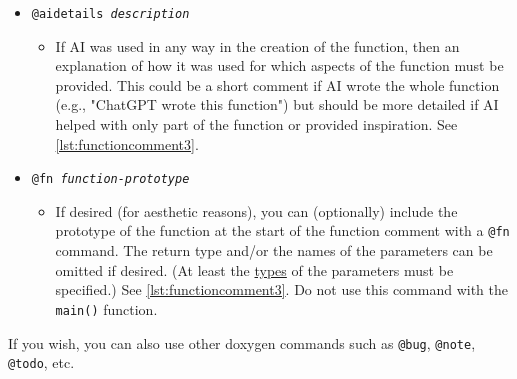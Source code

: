\documentclass{article}
\newcommand{\llabel}[1]{\hypertarget{llineno:#1}{\linelabel{#1}}}
\begin{document}
\begin{itemize}[label={}]
\begin{itemize}[label={}]
    \begin{itemize}[label={$\bullet$}, parsep=-1pt]
    \item \texttt{@ai Not Used} -- indicates that AI was not used in any way in the development of this function. No other \texttt{@ai} commands must be present in the function comment.
    \item \texttt{@ai Wrote Code} -- indicates that an AI tool wrote some or all of the compilable code in this function.
    \item \texttt{@ai Wrote Comments} -- indicates that an AI tool was used to write some or all of the comment text for this function (which includes this function comment and/or comments within the function).
    \item \texttt{@ai Inspiration} -- indicates that you took inspiration from an AI tool (e.g. discovered the existence of a library function). (This attribute is assumed and need not be specified if the \texttt{@ai Wrote Code} command is present for that function.)
    \item \texttt{@ai Debugging} -- indicates that an AI tool was used to help debug the code in this function.
    \item \texttt{@ai Testing} -- indicates that an AI tool was used to help in the testing of the code in this function.
    \end{itemize}
\end{itemize}

\item \texttt{@aidetails \textit{description}}
    \begin{itemize}[label={}]
    \item If AI was used in any way in the creation of the function, then an explanation of how it was used for which aspects of the function must be provided. This could be a short comment if AI wrote the whole function (e.g., "ChatGPT wrote this function") but should be more detailed if AI helped with only part of the function or provided inspiration. See \autoref{lst:functioncomment3}.\llabel{line:aiend}
    \end{itemize}
    
\item \texttt{@fn \textit{function-prototype}}
    \begin{itemize}[label={}]
    \item If desired (for aesthetic reasons), you can (optionally) include the prototype of the function at the start of 
    the function comment with a \texttt{@fn} command. The return type and/or the names of the
    parameters can be omitted if desired. (At least the \underline{types} of the parameters must be specified.) See \autoref{lst:functioncomment3}. Do not use this command with the \texttt{main()} function.
    \end{itemize}
    
\end{itemize}
If you wish, you can also use other doxygen commands such as \texttt{@bug}, \texttt{@note}, \texttt{@todo}, etc.
\end{document}
